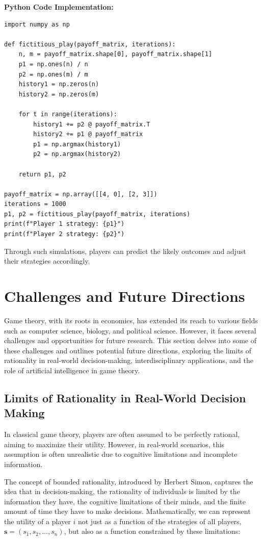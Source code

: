 \documentclass[12pt]{book} %
\begin{document}
\textbf{Python Code Implementation:}
\FloatBarrier
\begin{lstlisting}
import numpy as np

def fictitious_play(payoff_matrix, iterations):
    n, m = payoff_matrix.shape[0], payoff_matrix.shape[1]
    p1 = np.ones(n) / n
    p2 = np.ones(m) / m
    history1 = np.zeros(n)
    history2 = np.zeros(m)
    
    for t in range(iterations):
        history1 += p2 @ payoff_matrix.T
        history2 += p1 @ payoff_matrix
        p1 = np.argmax(history1)
        p2 = np.argmax(history2)
    
    return p1, p2

payoff_matrix = np.array([[4, 0], [2, 3]])
iterations = 1000
p1, p2 = fictitious_play(payoff_matrix, iterations)
print(f"Player 1 strategy: {p1}")
print(f"Player 2 strategy: {p2}")
\end{lstlisting}
\FloatBarrier

Through such simulations, players can predict the likely outcomes and adjust their strategies accordingly.


\section{Challenges and Future Directions}
Game theory, with its roots in economics, has extended its reach to various fields such as computer science, biology, and political science. However, it faces several challenges and opportunities for future research. This section delves into some of these challenges and outlines potential future directions, exploring the limits of rationality in real-world decision-making, interdisciplinary applications, and the role of artificial intelligence in game theory.

\subsection{Limits of Rationality in Real-World Decision Making}
In classical game theory, players are often assumed to be perfectly rational, aiming to maximize their utility. However, in real-world scenarios, this assumption is often unrealistic due to cognitive limitations and incomplete information. 

The concept of bounded rationality, introduced by Herbert Simon, captures the idea that in decision-making, the rationality of individuals is limited by the information they have, the cognitive limitations of their minds, and the finite amount of time they have to make decisions. Mathematically, we can represent the utility of a player $i$ not just as a function of the strategies of all players, $\mathbf{s} = (s_1, s_2, \ldots, s_n)$, but also as a function constrained by these limitations:
\end{document}
